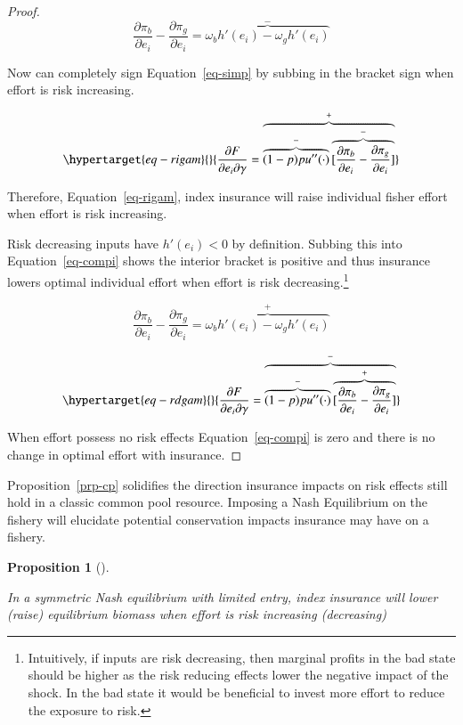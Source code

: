 \documentclass[
  super,
  preprint,
  3p]{elsarticle}
\theoremstyle{plain}
\newtheorem{proposition}{Proposition}[section]
\theoremstyle{plain}
\theoremstyle{remark}
\begin{document}
\begin{proof}
\[
\frac{\partial \pi_b}{\partial e_i}-\frac{\partial \pi_g}{\partial e_i}=\overbrace{\omega_bh'(e_i)-\omega_gh'(e_i)}^{-}
\]

Now can completely sign Equation~\ref{eq-simp} by subbing in the bracket
sign when effort is risk increasing.

\begin{equation}\protect\hypertarget{eq-rigam}{}{
\frac{\partial F}{\partial e_i \partial \gamma}=\overbrace{\overbrace{(1-p)pu''(\cdot)}^{-}\overbrace{[\frac{\partial \pi_b}{\partial e_i}-\frac{\partial \pi_g}{\partial e_i}]}^{-}}^{+}
}\label{eq-rigam}\end{equation}

Therefore, Equation~\ref{eq-rigam}, index insurance will raise
individual fisher effort when effort is risk increasing.

Risk decreasing inputs have \(h'(e_i)<0\) by definition. Subbing this
into Equation~\ref{eq-compi} shows the interior bracket is positive and
thus insurance lowers optimal individual effort when effort is risk
decreasing.\footnote{Intuitively, if inputs are risk decreasing, then
  marginal profits in the bad state should be higher as the risk
  reducing effects lower the negative impact of the shock. In the bad
  state it would be beneficial to invest more effort to reduce the
  exposure to risk.}

\[
\frac{\partial \pi_b}{\partial e_i}-\frac{\partial \pi_g}{\partial e_i}=\overbrace{\omega_bh'(e_i)-\omega_gh'(e_i)}^{+}
\]

\begin{equation}\protect\hypertarget{eq-rdgam}{}{
\frac{\partial F}{\partial e_i \partial \gamma}=\overbrace{\overbrace{(1-p)pu''(\cdot)}^{-}\overbrace{[\frac{\partial \pi_b}{\partial e_i}-\frac{\partial \pi_g}{\partial e_i}]}^{+}}^{-}
}\label{eq-rdgam}\end{equation}

When effort possess no risk effects Equation~\ref{eq-compi} is zero and
there is no change in optimal effort with insurance.

\end{proof}

Proposition~\ref{prp-cp} solidifies the direction insurance impacts on
risk effects still hold in a classic common pool resource. Imposing a
Nash Equilibrium on the fishery will elucidate potential conservation
impacts insurance may have on a fishery.

\begin{proposition}[]\protect\hypertarget{prp-synas}{}\label{prp-synas}

In a symmetric Nash equilibrium with limited entry, index insurance will
lower (raise) equilibrium biomass when effort is risk increasing
(decreasing)

\end{proposition}
\end{document}
